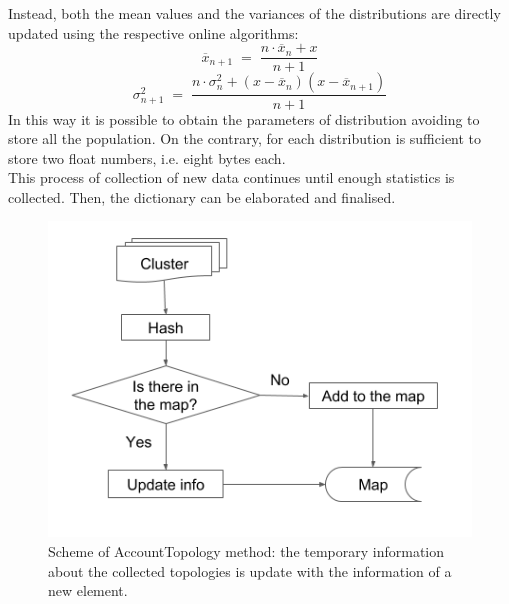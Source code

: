 Instead, both the mean values and the variances of the distributions are directly updated using the respective online algorithms:
\begin{equation}
 \overline{x}_{n + 1} \; = \; \frac{n \cdot \overline{x}_n + x}{n + 1}
\end{equation}
\begin{equation}
 \sigma^2_{n + 1} \; = \; \frac{n \cdot \sigma^2_n + (x - \overline{x}_n)(x - \overline{x}_{n + 1})}{n + 1}
\end{equation}
In this way it is possible to obtain the parameters of distribution avoiding to store all the population. On the contrary, for each distribution is sufficient to store two float numbers, i.e. eight bytes each.\\
This process of collection of new data continues until enough statistics is collected. Then, the dictionary can be elaborated and finalised.\\
%
\begin{figure}
  \centering
  \includegraphics[scale=0.6]{figures/account.png}
  \caption{Scheme of AccountTopology method: the temporary information about the collected topologies is update with the information of a new element.}
  \label{fig:account}
\end{figure}
%
